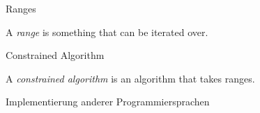 \begin{frame}{Ranges}
    \begin{center}
        A \emph{range} is something that can be iterated over.
    \end{center}
\end{frame}

\begin{frame}{Constrained Algorithm}
    \begin{center}
        A \emph{constrained algorithm} is an algorithm that takes ranges.
    \end{center}
\end{frame}

\begin{frame}{Implementierung anderer Programmiersprachen}

\end{frame}